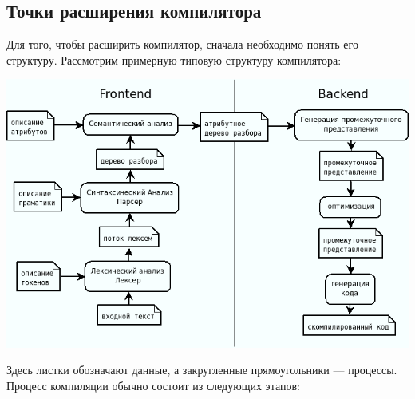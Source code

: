 \documentclass[a4paper,12pt,titlepage]{extarticle}
\begin{document}
\subsection{Точки расширения компилятора}
Для того, чтобы расширить компилятор, сначала необходимо понять его структуру.
Рассмотрим примерную типовую структуру компилятора:
\begin{center}
 \includegraphics[scale=0.6]{img/compiler2.png}
\end{center}
Здесь листки обозначают данные, а закругленные прямоугольники --- процессы.
\newline \newline
Процесс компиляции обычно состоит из следующих этапов:
\end{document}
